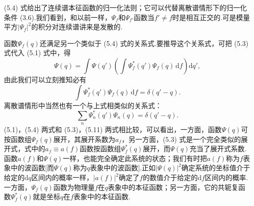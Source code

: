 (5.4) 式给出了连续谱本征函数的归一化法则；它可以代替离散谱情形下的归一化条件 (3.6).我们看到，和以前一样，$\varPsi_f$和$\varPsi_{f'}$函数当$f'\neq f$时是相互正交的.可是模量平方$|\varPsi_f|^2$的积分对连续谱讲来是发散的.

函数$\varPsi_f(q)$还满足另一个类似于 (5.4) 式的关系式.要推导这个关系式，可把 (5.3) 式代入 (5.1) 式中，得
\begin{equation*}
  \varPsi(q)=\int\varPsi(q')\left(\int\varPsi_f^{*}(q')\varPsi_f(q)\,\mathrm{d}f\right)\mathrm{d}q',
\end{equation*}
由此我们可以立刻推知必有
\begin{equation}
  \int\varPsi_f^{*}(q')\varPsi_f(q)\,\mathrm{d}f=\delta(q'-q).
\end{equation}
离散谱情形中当然也有一个与上式相类似的关系式：
\begin{equation}
  \sum_n\varPsi_n^{*}(q')\varPsi_n(q)=\delta(q'-q).
\end{equation}
(5.1)，(5.4) 两式和 (5.3)，(5.11) 两式相比较，可以看出，一方面，函数$\varPsi(q)$可按函数组$\varPsi_f(q)$展开，其展开系数为$a_f$，另一方面，(5.3) 式是一个完全类似的展开式，式中的$a_f\equiv a(f)$函数按函数组$\varPsi_f^{*}(q)$展开，而$\varPsi(q)$充当了展开式系数.函数$a(f)$和$\varPsi(q)$一样，也能完全确定此系统的状态；我们有时把$a(f)$称为$f$表象中的波函数[而$\varPsi(q)$称为$q$表象中的波函数].正如$|\varPsi(q)|^2$确定系统的坐标值介于给定的$\mathrm{d}q$区间内的概率一样，$|a(f)|^2$确定了$f$的数值介于给定的$\mathrm{d}f$区间内的概率.一方面，$\varPsi_f(q)$函数为物理量$f$在$q$表象中的本征函数；另一方面，它的共轭复函数$\varPsi_f^{*}(q)$就是坐标$q$在$f$表象中的本征函数.

